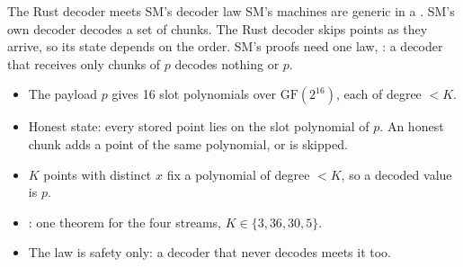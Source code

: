 \begin{frame}[t]{The Rust decoder meets SM's decoder law}
  \footnotesize
  SM's machines are generic in a . SM's own decoder decodes a set of chunks.
  The Rust decoder skips points as they arrive, so its state depends on the order. SM's proofs
  need one law, : a decoder that receives only chunks of $p$ decodes nothing or
  $p$.
  \vspace{0.2em}

  \centering
  \vspace{0.3em}

  \raggedright
  \begin{itemize}\footnotesize
    \item The payload $p$ gives 16 slot polynomials over $\mathrm{GF}(2^{16})$, each of degree
      $< K$.
    \item Honest state: every stored point lies on the slot polynomial of $p$. An honest chunk
      adds a point of the same polynomial, or is skipped.
    \item $K$ points with distinct $x$ fix a polynomial of degree $< K$, so a decoded value is $p$.
    \item {}: one theorem for the four streams, $K \in \{3, 36, 30, 5\}$.
    \item The law is safety only: a decoder that never decodes meets it too.
  \end{itemize}
\end{frame}

